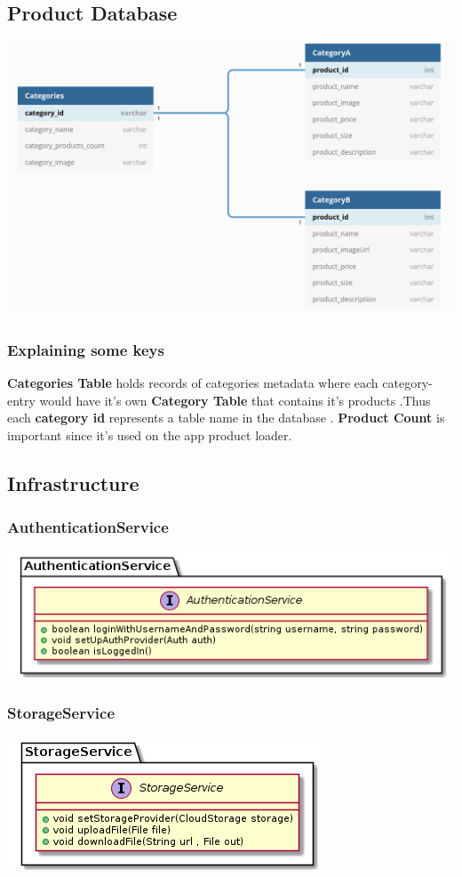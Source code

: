 \documentclass{article}
\begin{document}
\subsection{Product Database}
\includegraphics[scale=0.3]{./out/NodeApp/Database/ProductsTable.png}
\subsubsection{Explaining some keys}
\textbf{Categories Table } holds records of categories metadata where each category-entry would have it's own \textbf{Category Table} that contains it's products .Thus each \textbf{category id} represents a table name in the database .\newline
\textbf{Product Count} is important since it's used on the app product loader.

\subsection{Infrastructure}
\subsubsection{AuthenticationService}
\includegraphics[scale=0.75]{./out/NodeApp/AuthenticationService/AuthService.png}

\subsubsection{StorageService}
\includegraphics[scale=0.75]{./out/NodeApp/StorageService/StorageService.png}
\end{document}
